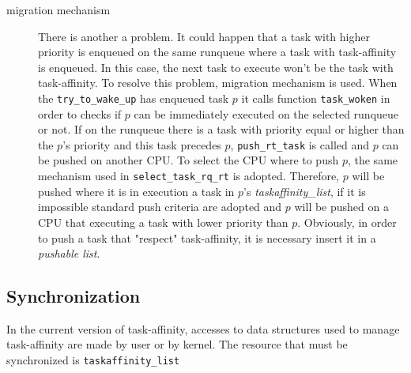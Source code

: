\begin{description}
\item[migration mechanism] There is another a problem. It could happen that a task with higher priority is enqueued on the same runqueue where a task with 
task-affinity is enqueued. In this case, the next task to execute won't be the task with task-affinity.
To resolve this problem, migration mechanism is used. When the \texttt{try\_to\_wake\_up} has enqueued task $p$ it calls function \texttt{task\_woken} in 
order to checks if $p$ can be immediately executed on the selected runqueue or not. If on the runqueue there is a task with priority equal or higher than 
the $p$'s priority and this task precedes $p$, \texttt{push\_rt\_task} is called
and $p$ can be pushed on another CPU. To select the CPU where to push $p$, 
the same mechanism used in \texttt{select\_task\_rq\_rt} is adopted. Therefore, $p$ will be pushed where it is in execution a task in $p$'s 
\textit{taskaffinity\_list}, if it is impossible standard push criteria are
adopted and $p$ will be pushed on a CPU that executing a task with lower 
priority than $p$. Obviously, in order to push a task that "respect" task-affinity, it is necessary insert it in a \textit{pushable list}. 

\end{description}
\subsection{Synchronization}

In the current version of task-affinity, accesses to data structures used to manage task-affinity are made by user or by kernel. The resource that must be
synchronized is \texttt{taskaffinity\_list}

